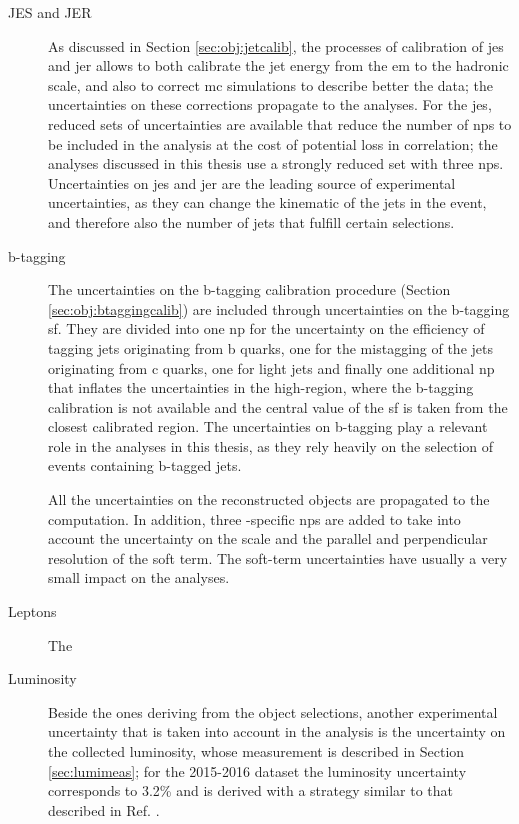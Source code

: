\begin{description}

\item[JES and JER] As discussed in Section \ref{sec:obj:jetcalib}, the processes of calibration of \gls{jes} and \gls{jer} allows to both calibrate the jet energy from the \gls{em} to the
hadronic scale, and also to correct \gls{mc} simulations to describe better the data; the uncertainties on these corrections propagate to the analyses. 
For the \gls{jes}, reduced sets of uncertainties are available that reduce the number of \glspl{np} to be included in the analysis at the cost of potential loss in correlation; 
the analyses discussed in this thesis use a strongly reduced set with three \glspl{np}. 
Uncertainties on \gls{jes} and \gls{jer} are the leading source of experimental uncertainties, as they can change the kinematic of the jets in the event, and therefore also the number
of jets that fulfill certain selections.

\item[b-tagging] The uncertainties on the b-tagging calibration procedure (Section \ref{sec:obj:btaggingcalib}) are included through uncertainties on the b-tagging \gls{sf}. 
They are divided into one \gls{np} for the uncertainty on the efficiency of tagging jets originating from b quarks, one for the mistagging of the jets originating from 
c quarks, one for light jets and finally one additional \gls{np} that inflates the uncertainties in the high-\pt region, where the b-tagging calibration is not available and the central 
value of the \gls{sf} is taken from the closest calibrated \pt region. 
The uncertainties on b-tagging play a relevant role in the analyses in this thesis, as they rely heavily on the selection of events containing b-tagged jets.

\item[\met] All the uncertainties on the reconstructed objects are propagated to the \met computation. In addition, three \met-specific \glspl{np} are added to take into
account the uncertainty on the scale and the parallel and perpendicular resolution of the \met soft term. The soft-term uncertainties have usually a very small impact on
the analyses. 

\item[Leptons] The 


\item[Luminosity] Beside the ones deriving from the object selections, another experimental uncertainty that is taken into account in the analysis is 
the uncertainty on the collected luminosity, whose measurement is described in Section \ref{sec:lumimeas}; for the 2015-2016 dataset the luminosity uncertainty corresponds 
to 3.2\% and is derived with a strategy similar to that described in Ref. \cite{Aaboud:2016hhf}. 


\end{description}






